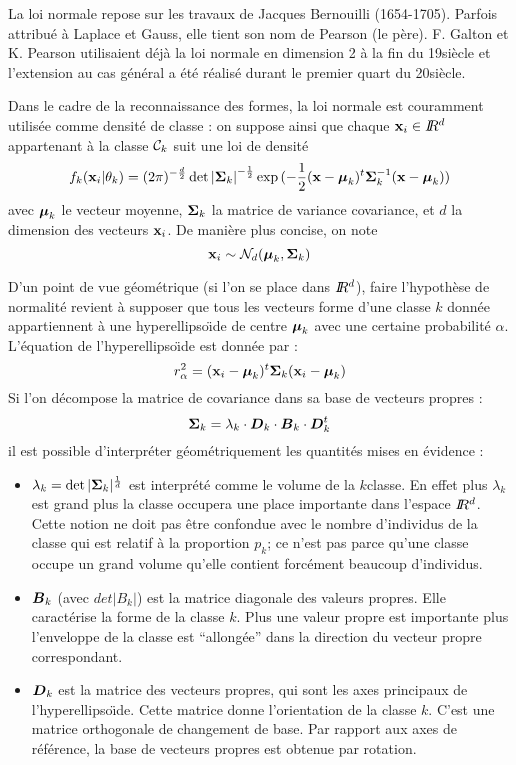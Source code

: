 La loi normale repose sur les travaux de Jacques Bernouilli (1654-1705).
Parfois attribu\'e \`a Laplace et Gauss, elle tient son nom
de Pearson (le p\`ere). F. Galton et K. Pearson utilisaient d\'ej\`a
la loi normale en dimension 2 \`a la fin du 19\ieme si\`ecle et l'extension
au cas g\'en\'eral a \'et\'e r\'ealis\'e durant le premier quart
du 20\ieme si\`ecle. 

Dans le cadre de la reconnaissance des formes, la loi
normale est couramment utilis\'ee comme densit\'e 
de classe : on suppose ainsi que chaque $\mbox{\bf x}_i \in I\!\!R^d$  
appartenant \`a la classe ${\cal C}_k$ suit une loi de densit\'e 
\begin{equation}
f_k(\mbox{\bf x}_i | \theta_k)=(2\pi)^{-\frac{d}{2}}  \det{|\mbox{\boldmath $\Sigma$}_k|}^{-\frac{1}{2}}
\exp{(-\frac{1}{2}(\mbox{\bf x}-\mbox{\boldmath $\mu$}_k)^t \mbox{\boldmath $\Sigma$}_k^{-1} (\mbox{\bf x}-\mbox{\boldmath $\mu$}_k))} 
\end{equation}
avec $\mbox{\boldmath $\mu$}_k$  le vecteur moyenne, $\mbox{\boldmath $\Sigma$}_k$ la matrice 
de variance covariance, et $d$ la dimension des vecteurs $\mbox{\bf x}_i$.
De mani\`ere plus concise, on note 
$$
\mbox{\bf x}_i \sim {\cal N}_d(\mbox{\boldmath $\mu$}_k,\mbox{\boldmath $\Sigma$}_k)
$$

D'un point de vue g\'eom\'etrique (si l'on se place dans $I\!\!R^d$), faire
l'hypoth\`ese de normalit\'e revient \`a supposer que tous les vecteurs
forme d'une classe $k$ donn\'ee appartiennent \`a une hyperellipso\"{\i}de 
de centre $\mbox{\boldmath $\mu$}_k$ avec une certaine probabilit\'e $\alpha$. L'\'equation
de l'hyperellipso\"{\i}de est donn\'ee par :
$$
r_\alpha^2=(\mbox{\bf x}_i-\mbox{\boldmath $\mu$}_k)^t \mbox{\boldmath $\Sigma$}_k (\mbox{\bf x}_i-\mbox{\boldmath $\mu$}_k)
$$ 
Si l'on d\'ecompose  la matrice de covariance dans sa base de vecteurs propres :
\begin{equation}
\mbox{\boldmath $\Sigma$}_k=\lambda_k \cdot \mbox{\boldmath $D$}_k \cdot \mbox{\boldmath $B$}_k \cdot \mbox{\boldmath $D$}_k^t
\end{equation}   
il est possible d'interpr\'eter g\'eom\'etriquement les quantit\'es
mises en \'evidence :
\begin{itemize}
\item $\lambda_k=\det{|\mbox{\boldmath $\Sigma$}_k|^{\frac{1}{d}}}$ est interpr\'et\'e comme le volume de
la $k$\ieme classe. En effet plus $\lambda_k$ est grand plus la classe occupera une
place importante dans l'espace $I\!\!R^d$. Cette notion ne doit pas \^etre confondue avec 
le nombre d'individus de la classe qui est relatif \`a la proportion $p_k$; ce n'est pas
parce qu'une classe occupe un grand volume qu'elle contient forc\'ement beaucoup d'individus.

\item $\mbox{\boldmath $B$}_k$ (avec $det{|B_k|}$) est la matrice diagonale des valeurs propres.
Elle caract\'erise la forme de la
classe $k$. Plus une valeur propre est importante plus l'enveloppe de la classe
est ``allong\'ee'' dans la direction du vecteur propre correspondant.

\item $\mbox{\boldmath $D$}_k$ est la matrice des vecteurs propres, qui sont les axes principaux
de l'hyperellipso\"{\i}de.  Cette matrice donne l'orientation de la 
classe $k$. C'est une matrice orthogonale de changement de base. Par rapport
aux axes de r\'ef\'erence, la base de vecteurs propres est obtenue par rotation. 
\end{itemize}

